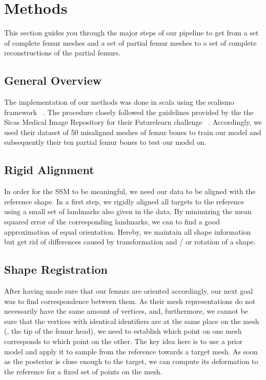 \section{Methods}
\label{sec:methods}

This section guides you through the major steps of our pipeline to get from a set of complete femur meshes and a set of partial femur meshes to a set of complete reconstructions of the partial femurs.


\subsection{General Overview}
\label{subsec:overview}
The implementation of our methods was done in scala using the scalismo framework ~\cite{scalismo}.
The procedure closely followed the guidelines provided by the the Sicas Medical Image Repository for their Futurelearn challenge ~\cite{smir}. 
Accordingly, we used their dataset of 50 misaligned meshes of femur bones to train our model and subsequently their ten partial femur bones to test our model on. 


\subsection{Rigid Alignment}
\label{subsec:rigid}

In order for the SSM to be meaningful, we need our data to be aligned with the reference shape.
In a first step, we rigidly aligned all targets  to the reference using a small set of landmarks also given in the data.
By minimizing the mean squared error of the corresponding landmarks, we can to find a good approximation of equal orientation.
Hereby, we maintain all shape information but get rid of differences caused by transformation and / or rotation of a shape.


\subsection{Shape Registration}
\label{subsec:registr}

After having made sure that our femurs are oriented accordingly, our next goal was to find correspondence between them.
As their mesh representations do not necessarily have the same amount of vertices, and, furthermore, we cannot be sure that the vertices with identical identifiers are at the same place on the mesh (\eg, the tip of the femur head), we need to establish which point on one mesh corresponds to which point on the other.
The key idea here is to use a prior model  and apply it to sample from the reference towards a target mesh.
As soon as the posterior  is close enough to the target, we can compute its deformation to the reference for a fixed set of points on the mesh.


